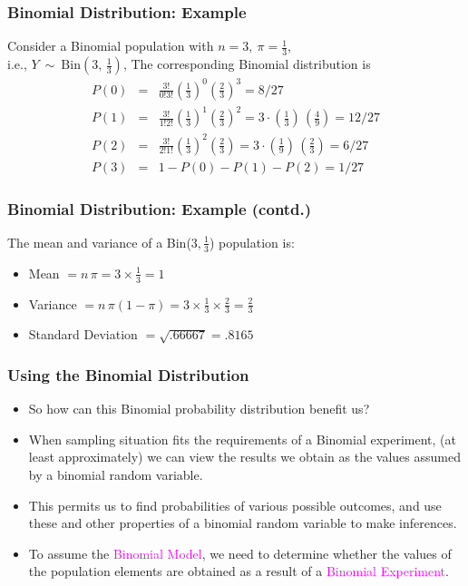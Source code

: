 \documentclass[xcolor=dvipsnames,12pt]{beamer}
\begin{document}
\begin{frame}
\frametitle{Binomial Distribution: Example}
 Consider a Binomial population with
$n=3,\ \pi = \frac13$,\\[.01in] 
i.e., $Y\ \sim\ \mbox{Bin}(3,\,\frac13)$, The corresponding Binomial distribution is\\
\begin{eqnarray*}
  P(0) &=& \frac{3!}{0!3!} \left(\frac13 \right)^0 \left( \frac23
           \right)^3 = 8/27\\[.1in]
  P(1) &=&  \frac{3!}{1!2!} \left(\frac13 \right)^1 \left( \frac23
           \right)^2 = 3 \cdot \left( \frac13
           \right)\, \left(\frac49 \right) = 12/27 \\[.1in]    
  P(2) &=&  \frac{3!}{2!1!} \left(\frac13 \right)^2 \left( \frac23
           \right) = 3 \cdot \left( \frac19
           \right)\, \left(\frac23 \right) = 6/27 \\[.2in]
  P(3) &=& 1 - P(0) - P(1) - P(2) = 1/27
\end{eqnarray*}
\end{frame}


\begin{frame}
\frametitle{Binomial Distribution: Example (contd.)}
The mean and variance of a Bin($3,\frac{1}{3}$) population is:
\begin{itemize}
\item Mean  $ = n \, \pi =  3 \times\frac{1}{3} = 1 $
\item Variance $  =  n\,\pi(1 - \pi) =  3 \times\frac{1}{3}\times\frac{2}{3} =
\frac{2}{3} $ 
\item Standard Deviation $ = \sqrt{.66667} = .8165$
\end{itemize}
\end{frame}



\begin{frame}
\frametitle{Using the Binomial Distribution}
\begin{itemize}
\item So how can this Binomial probability distribution benefit us?  
\item When sampling situation fits the requirements of a Binomial experiment, 
(at least approximately) we can view the results we obtain as the 
values assumed by a binomial random variable.  
\item This permits us to find probabilities of various
possible outcomes, and use these and other properties of a
binomial random variable to make inferences. 
\item To assume the \textcolor{magenta}{Binomial Model}, we need to determine whether
the values of the population elements are obtained as a result of a
\textcolor{magenta}{Binomial Experiment}. 
\end{itemize}
\end{frame}
\end{document}
